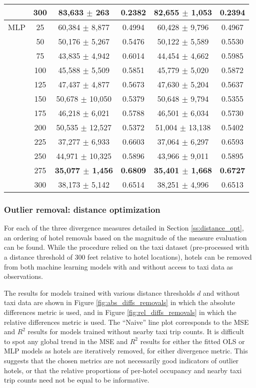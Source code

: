 \documentclass[useAMS, usenatbib]{biom}
\begin{document}
\begin{table}
\begin{center}
{\begin{tabular}{||c|c|c|c|c|c||}
 & 300 & 83,633 $\pm$ 263 & 0.2382 & \textbf{82,655 $\pm$ 1,053} & \textbf{0.2394} \\
 \hline
 MLP & 25 & 60,384 $\pm$ 8,877 & 0.4994 & 60,428 $\pm$ 9,796 & 0.4967 \\
 & 50 & 50,176 $\pm$ 5,267 & 0.5476 & 50,122 $\pm$ 5,589 & 0.5530 \\
 & 75 & 43,835 $\pm$ 4,942 & 0.6014 & 44,454 $\pm$ 4,662 & 0.5985 \\
 & 100 & 45,588 $\pm$ 5,509 & 0.5851 & 45,779 $\pm$ 5,020 & 0.5872 \\
 & 125 & 47,437 $\pm$ 4,877 & 0.5673 & 47,630 $\pm$ 5,204 & 0.5637 \\
 & 150 & 50,678 $\pm$ 10,050 & 0.5379 & 50,648 $\pm$ 9,794 & 0.5355 \\
 & 175 & 46,218 $\pm$ 6,021 & 0.5788 & 46,501 $\pm$ 6,034 & 0.5730 \\
 & 200 & 50,535 $\pm$ 12,527 & 0.5372 & 51,004 $\pm$ 13,138 & 0.5402 \\
 & 225 & 37,277 $\pm$ 6,933 & 0.6603 & 37,064 $\pm$ 6,297 & 0.6593 \\
 & 250 & 44,971 $\pm$ 10,325 & 0.5896 & 43,966 $\pm$ 9,011 & 0.5895 \\
 & 275 & \textbf{35,077 $\pm$ 1,456} & \textbf{0.6809} & \textbf{35,401 $\pm$ 1,668} & \textbf{0.6727} \\
 & 300 & 38,173 $\pm$ 5,142 & 0.6514 & 38,251 $\pm$ 4,996 & 0.6513 \\
 \hline
\end{tabular}
}
\end{center}
\end{table}

\subsubsection{Outlier removal: distance optimization}
\label{ss:outlier_optimization}

For each of the three divergence measures detailed in Section \ref{ss:distance_opt}, an ordering of hotel removals based on the magnitude of the measure evaluation can be found. While the procedure relied on the taxi dataset (pre-processed with a distance threshold of 300 feet relative to hotel locations), hotels can be removed from both machine learning models with and without access to taxi data as observations.

The results for models trained with various distance thresholds $d$ and without taxi data are shown in Figure \ref{fig:abs_diffs_removals} in which the absolute differences metric is used, and in Figure \ref{fig:rel_diffs_removals} in which the relative differences metric is used. The ``Naive'' line plot corresponds to the MSE and $R^2$ results for models trained without nearby taxi trip counts. It is difficult to spot any global trend in the MSE and $R^2$ results for either the fitted OLS or MLP models as hotels are iteratively removed, for either divergence metric. This suggests that the chosen metrics are not necessarily good indicators of outlier hotels, or that the relative proportions of per-hotel occupancy and nearby taxi trip counts need not be equal to be informative.
\end{document}

